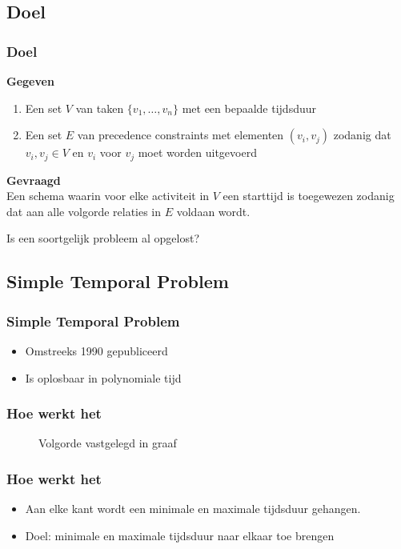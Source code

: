 \documentclass{beamer}
\theoremstyle{definition}
\newcommand{\inputtikz}[1]{}
\begin{document}
\subsection{Doel}
\begin{frame}
    	\frametitle{Doel}
   	\textbf{Gegeven}
	\begin{enumerate}
		\item Een set $V$ van taken $\{v_1,\dots,v_n\}$ met een bepaalde tijdsduur
		\item Een set $E$ van precedence constraints met elementen $(v_i, v_j)$ zodanig dat $v_i, v_j \in V$ en $v_i$ voor $v_j$ moet worden uitgevoerd
	\end{enumerate}
	
	\textbf{Gevraagd}\\
	Een schema waarin voor elke activiteit in $V$ een starttijd is toegewezen zodanig dat aan alle volgorde relaties in $E$ voldaan wordt.
\end{frame}

\begin{frame}
	\begin{center}
		Is een soortgelijk probleem al opgelost?
	\end{center}
\end{frame}

\subsection{Simple Temporal Problem}
\begin{frame}
    	\frametitle{Simple Temporal Problem}
	
	\begin{itemize}
		\item Omstreeks 1990 gepubliceerd
		\item Is oplosbaar in polynomiale tijd
	\end{itemize}
   	
\end{frame}

\begin{frame}
    	\frametitle{Hoe werkt het}
	
	\begin{figure}[ht]
		\inputtikz{stn_precedence}
		\vspace{-1em}
		\caption{Volgorde vastgelegd in graaf}
	\end{figure}
\end{frame}

\begin{frame}
    	\frametitle{Hoe werkt het}
	
	\begin{itemize}
		\item Aan elke kant wordt een minimale en maximale tijdsduur gehangen.
		\item Doel: minimale en maximale tijdsduur naar elkaar toe brengen
	\end{itemize}
	
\end{frame}
\end{document}
